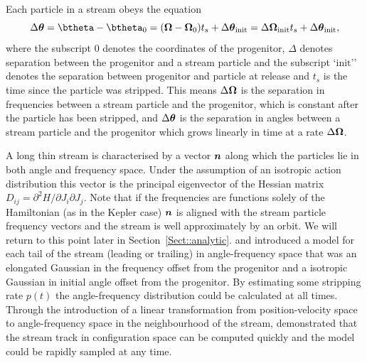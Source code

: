 \documentclass[useAMS,usenatbib,fleqn,a4paper]{mn2e}
\newcommand{\bs}[1]{\bmath{#1}}
\begin{document}
Each particle in a stream obeys the equation
\begin{equation}\label{linearevol}
\Delta\bs{\theta} = \btheta-\btheta_0 = (\boldsymbol{\Omega}-\boldsymbol{\Omega}_0)t_s +\Delta\bs{\theta}_\mathrm{init}= \Delta\bs{\Omega}_\mathrm{init}t_s+\Delta\bs{\theta}_\mathrm{init},
\end{equation}
where the subscript $0$ denotes the coordinates of the progenitor, $\Delta$ denotes separation between the progenitor and a stream particle and the subscript `$\mathrm{init}$'' denotes the separation between progenitor and particle at release and $t_s$ is the time since the particle was stripped. This means $\Delta\bs{\Omega}$ is the separation in frequencies between a stream particle and the progenitor, which is constant after the particle has been stripped, and $\Delta\bs{\theta}$ is the separation in angles between a stream particle and the progenitor which grows linearly in time at a rate $\Delta\bs{\Omega}$.

A long thin stream is characterised by a vector $\bs{n}$ along which the particles lie in both angle and frequency space. Under the assumption of an isotropic action distribution this vector is the principal eigenvector of the Hessian matrix $D_{ij}=\partial^2 H/\partial J_i\partial J_j$. Note that if the frequencies are functions solely of the Hamiltonian (as in the Kepler case) $\bs{n}$ is aligned with the stream particle frequency vectors and the stream is well approximately by an orbit. We will return to this point later in Section~\ref{Sect::analytic}. \cite{Bovy2014} and \cite{Sanders2014} introduced a model for each tail of the stream (leading or trailing) in angle-frequency space that was an elongated Gaussian in the frequency offset from the progenitor and a isotropic Gaussian in initial angle offset from the progenitor. By estimating some stripping rate $p(t)$ the angle-frequency distribution could be calculated at all times. Through the introduction of a linear transformation from position-velocity space to angle-frequency space in the neighbourhood of the stream, \cite{Bovy2014} demonstrated that the stream track in configuration space can be computed quickly and the model could be rapidly sampled at any time.
\end{document}
